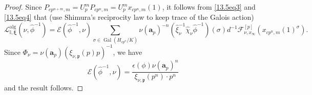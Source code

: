 \documentclass[10pt,a4paper]{amsart}
\DeclareMathOperator{\Gal}{Gal}
\newcommand{\I}{\mathbb{I}}
\begin{document}
\begin{proof}
Since ${P}_{cp^{n+m},m}=U_p^m{P}_{cp^n,m}=U_p^m x_{cp^n,m}(1)$, it follows from \eqref{13.5eq3} and \eqref{13.5eq4} that 
(use Shimura's reciprocity law to keep trace of the Galois action) 
\begin{equation}\label{13.5eq5}\mathscr{L}_{\I,\boldsymbol{\xi}}^{\mathrm{alg}}(\nu,\hat\phi^{-1})=\mathcal{E}(\hat\phi^{-1},\nu)\sum_{\sigma\in\Gal(H_{cp^n}/K)}\nu(\mathbf{a}_p)^{-n}(\hat\xi_\nu^{-1}\hat\chi_\nu\hat\phi^{-1})(\sigma)d^{-1}{\mathcal{F}_{\nu , x_\infty}^{[p]}}(x_{cp^{n},m}(1)^\sigma).\end{equation}
Since $\Phi_\nu=\nu(\mathbf{a}_p)({\xi}_{\nu, \mathfrak{p}}(p)p)^{-1}$, we have 
\[
\mathcal{E}(\hat\phi^{-1},\nu)
=\frac{\epsilon(\phi)\nu(\mathbf{a}_p)^n}
{{\xi}_{\nu,\mathfrak{p}}(p^n)\cdot p^n}
\] and the result follows. 
\end{proof}
\end{document}
